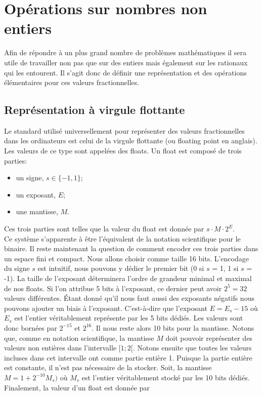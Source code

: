 \documentclass{article}
\begin{document}
\section{Opérations sur nombres non entiers}
Afin de répondre à un plus grand nombre de problèmes mathématiques il sera utile de travailler non pas que sur des entiers mais également sur les rationaux qui les entourent. Il s'agit donc de définir une représentation et des opérations élémentaires pour ces valeurs fractionnelles.
\subsection{Représentation à virgule flottante}
Le standard utilisé universellement pour représenter des valeurs fractionnelles dans les ordinateurs est celui de la virgule flottante (ou floating point en anglais). Les valeurs de ce type sont appelées des floats. Un float est composé de trois parties:
\begin{itemize}
    \item un signe, $s\in \{-1, 1\}$;
    \item un exposant, $E$;
    \item une mantisse, $M$.
\end{itemize}
Ces trois parties sont telles que la valeur du float est donnée par $s\cdot M\cdot 2^E$.\\
Ce système s'apparente à être l'équivalent de la notation scientifique pour le binaire.
Il reste maintenant la question de comment encoder ces trois parties dans un espace fini et compact. Nous allons choisir comme taille 16 bits. L'encodage du signe $s$ est intuitif, nous pouvons y dédier le premier bit (0 si $s$ = 1, 1 si $s$ = -1). La taille de l'exposant déterminera l'ordre de grandeur minimal et maximal de nos floats. Si l'on attribue 5 bits à l'exposant, ce dernier peut avoir $2^5 = 32$ valeurs différentes. Étant donné qu'il nous faut aussi des exposants négatifs nous pouvons ajouter un biais à l'exposant. C'est-à-dire que l'exposant $E = E_s - 15$ où $E_s$ est l'entier véritablement représente par les 5 bits dédiés. Les valeurs sont donc bornées par $2^{-15}$ et $2^{16}$. Il nous reste alors 10 bits pour la mantisse.
Notons que, comme en notation scientifique, la mantisse $M$ doit pouvoir représenter des valeurs non entières dans l'intervalle $[1; 2[$. Notons ensuite que toutes les valeurs incluses dans cet intervalle ont comme partie entière 1. Puisque la partie entière est constante, il n'est pas nécessaire de la stocker. Soit, la mantisse $M = 1+2^{-10}M_s)$ où $M_s$ est l'entier véritablement stocké par les 10 bits dédiés. Finalement, la valeur d'un float est donnée par
\end{document}
